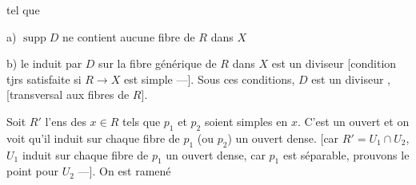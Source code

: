 tel que 

a) $\operatorname{supp}D$ ne contient aucune fibre de $R$ dans $X$

b) le   induit par $D$ sur la fibre générique de $R$ dans $X$ est un diviseur  [condition tjrs satisfaite si $R\longrightarrow X$ est simple ---]. Sous ces conditions, $D$ est un diviseur , [transversal aux fibres de $R$].

 Soit  $R'$ l'ens des $x\in R$ tels que $p_1$ et $p_2$ soient simples en $x$. C'est un ouvert et on voit qu'il induit sur chaque fibre de $p_1$ (ou $p_2$) un ouvert dense. [car $R'=U_1\cap U_2$, $U_1$ induit sur chaque fibre de $p_1$ un ouvert dense, car $p_1$ est séparable, prouvons le point pour $U_2$ ---]. On est ramené

